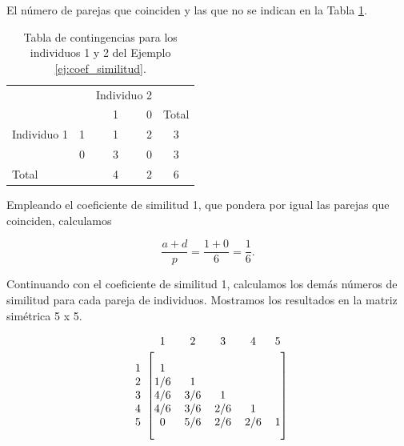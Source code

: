 \documentclass[a4paper, 20pt]{article}
\begin{document}
El número de parejas que coinciden y las que no se indican en la Tabla \ref{tab:contingencias-ej}.

\begin{table}[h]
  \centering
  \caption{Tabla de contingencias para los individuos 1 y 2 del Ejemplo \ref{ej:coef_similitud}.}
  \label{tab:contingencias-ej}
\resizebox{6.5cm}{!} {
  \begin{tabular}{lrrrrr}
    \toprule
\multicolumn{2}{l}{\multirow{2}{*}{}} & \multicolumn{2}{c}{Individuo 2} & \\\cmidrule{3-4}
\multicolumn{2}{l}{}                  & 1        &   0       & \multicolumn{2}{c}{Total}                        \\ \midrule
Individuo 1      & 1      & 1        &  2       & \multicolumn{2}{c}{3}                     \\
                              & 0      & 3        &    0       & \multicolumn{2}{c}{3}                     \\ \midrule
\multicolumn{2}{l}{Total}            & 4     & 2     & \multicolumn{2}{c}{6}\\
\bottomrule
\end{tabular}
}
\end{table}

Empleando el coeficiente de similitud 1, que pondera por igual las parejas que coinciden, calculamos

$$\frac{a+d}{p}=\frac{1+0}{6}=\frac{1}{6}. $$

Continuando con el coeficiente de similitud 1, calculamos los demás números de similitud para cada pareja de individuos. Mostramos los resultados en la matriz simétrica 5 x 5.


\[ 
\begin{blockarray}{cccccc}
	& 1 & 2 & 3 & 4 & 5 \\
	\begin{block}{c[ccccc]}
		\\
		1 & 1 &  &  &  \\
		2 & 1/6 & 1 &  &  \\
		3 & 4/6 & 3/6 & 1 & & \\
		4 & 4/6 & 3/6 & 2/6 & 1 &\\
		5 & 0 & 5/6 & 2/6 & 2/6 &  1\\
		\\
	\end{block}
\end{blockarray}  
\] 
\end{document}
